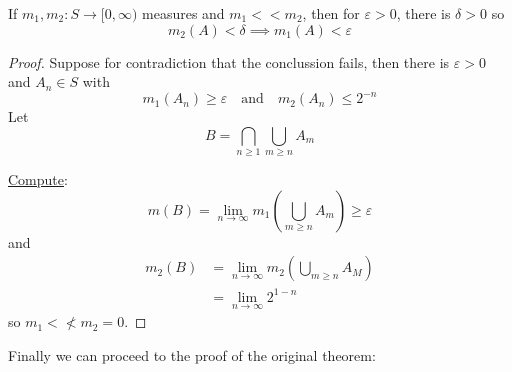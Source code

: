 \begin{lemma}
	If $m_1, m_2 : S \to [0, \infty)$ measures and
	 $m_1 << m_2$, then for $\varepsilon > 0$, there is $\delta > 0$ so
	 \[
	 	m_2(A) < \delta \implies m_1 (A) < \varepsilon
	 \]
\end{lemma}

\begin{proof}
	Suppose for contradiction that the conclussion fails,
	then there is $\varepsilon > 0 $ and $A_n \in S$ with
	\[
		m_1 (A_{n}) \geq \varepsilon \quad \text{and} \quad m_2 (A_n) \leq 2^{-n}
	\]
	Let
	\[
		B = \bigcap_{n \geq 1} \bigcup_{m \geq n} A_m
	\]

	\underline{Compute}:
	\[
		m(B) = \lim_{n \to \infty} m_1 ( \bigcup_{m \geq n} A_m ) \geq \varepsilon
	\] and
	\begin{align*}
		m_2 (B) &= \lim_{n \to \infty} m_2 (\bigcup_{m \geq n} A_M ) \\
				&= \lim_{n \to \infty} 2^{1 - n}
	\end{align*} so $m_1 <\nless m_2 = 0$.
\end{proof}

Finally we can proceed to the proof of the original theorem:

